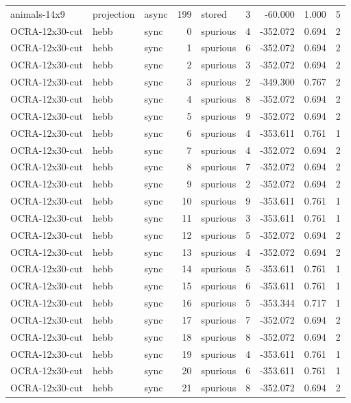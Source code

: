 \begin{tabular}{lllrlrrrr}
animals-14x9 & projection & async & 199 & stored & 3 & -60.000 & 1.000 & 5 \\
OCRA-12x30-cut & hebb & sync & 0 & spurious & 4 & -352.072 & 0.694 & 2 \\
OCRA-12x30-cut & hebb & sync & 1 & spurious & 6 & -352.072 & 0.694 & 2 \\
OCRA-12x30-cut & hebb & sync & 2 & spurious & 3 & -352.072 & 0.694 & 2 \\
OCRA-12x30-cut & hebb & sync & 3 & spurious & 2 & -349.300 & 0.767 & 2 \\
OCRA-12x30-cut & hebb & sync & 4 & spurious & 8 & -352.072 & 0.694 & 2 \\
OCRA-12x30-cut & hebb & sync & 5 & spurious & 9 & -352.072 & 0.694 & 2 \\
OCRA-12x30-cut & hebb & sync & 6 & spurious & 4 & -353.611 & 0.761 & 1 \\
OCRA-12x30-cut & hebb & sync & 7 & spurious & 4 & -352.072 & 0.694 & 2 \\
OCRA-12x30-cut & hebb & sync & 8 & spurious & 7 & -352.072 & 0.694 & 2 \\
OCRA-12x30-cut & hebb & sync & 9 & spurious & 2 & -352.072 & 0.694 & 2 \\
OCRA-12x30-cut & hebb & sync & 10 & spurious & 9 & -353.611 & 0.761 & 1 \\
OCRA-12x30-cut & hebb & sync & 11 & spurious & 3 & -353.611 & 0.761 & 1 \\
OCRA-12x30-cut & hebb & sync & 12 & spurious & 5 & -352.072 & 0.694 & 2 \\
OCRA-12x30-cut & hebb & sync & 13 & spurious & 4 & -352.072 & 0.694 & 2 \\
OCRA-12x30-cut & hebb & sync & 14 & spurious & 5 & -353.611 & 0.761 & 1 \\
OCRA-12x30-cut & hebb & sync & 15 & spurious & 6 & -353.611 & 0.761 & 1 \\
OCRA-12x30-cut & hebb & sync & 16 & spurious & 5 & -353.344 & 0.717 & 1 \\
OCRA-12x30-cut & hebb & sync & 17 & spurious & 7 & -352.072 & 0.694 & 2 \\
OCRA-12x30-cut & hebb & sync & 18 & spurious & 8 & -352.072 & 0.694 & 2 \\
OCRA-12x30-cut & hebb & sync & 19 & spurious & 4 & -353.611 & 0.761 & 1 \\
OCRA-12x30-cut & hebb & sync & 20 & spurious & 6 & -353.611 & 0.761 & 1 \\
OCRA-12x30-cut & hebb & sync & 21 & spurious & 8 & -352.072 & 0.694 & 2 \\

\end{tabular}
